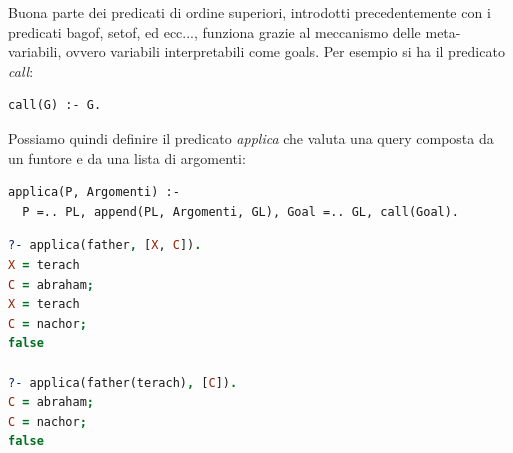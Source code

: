 \documentclass[a4paper]{report}
\begin{document}
Buona parte dei predicati di ordine superiori, introdotti precedentemente con i predicati bagof, setof, ed ecc..., funziona grazie al meccanismo
delle meta-variabili, ovvero variabili interpretabili come goals.\newline
Per esempio si ha il predicato \textit{call}:
\begin{verbatim}
call(G) :- G.
\end{verbatim}
Possiamo quindi definire il predicato \textit{applica }che valuta una query composta da un funtore e da una lista di argomenti:
\begin{verbatim}
applica(P, Argomenti) :-
  P =.. PL, append(PL, Argomenti, GL), Goal =.. GL, call(Goal).
\end{verbatim}
\begin{shaded}
\begin{lstlisting}[language=prolog]
?- applica(father, [X, C]).
X = terach
C = abraham;
X = terach
C = nachor;
false

?- applica(father(terach), [C]).
C = abraham;
C = nachor;
false
\end{lstlisting}
\end{shaded}
\end{document}
